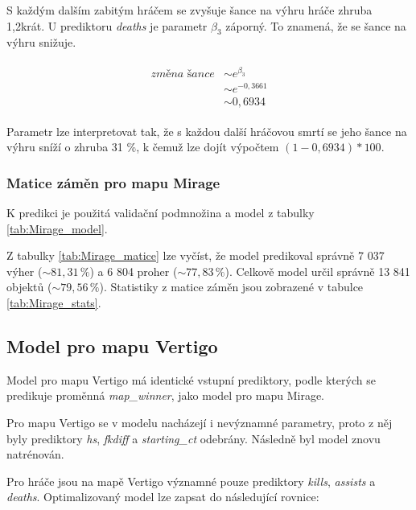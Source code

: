 S každým dalším zabitým hráčem se zvyšuje šance na výhru hráče zhruba 1,2krát. U prediktoru \textit{deaths} je parametr $\beta_3$ záporný. To znamená, že se šance
na výhru snižuje.

\begin{align}
    \begin{split}
        \textit{změna šance} &\sim e^{\beta_3} \\
                             &\sim e^{-0,3661} \\                     
                             &\sim 0,6934
    \end{split}
\end{align}

Parametr lze interpretovat tak, že s každou další hráčovou smrtí se jeho šance na výhru sníží o zhruba 31 \%, k čemuž lze dojít výpočtem $(1 - 0,6934)*100$. 

\subsubsection{Matice záměn pro mapu Mirage}
K predikci je použitá validační podmnožina a model z tabulky \ref{tab:Mirage_model}.





Z tabulky \ref{tab:Mirage_matice} lze vyčíst, že model predikoval správně 7 037 výher ($\sim 81,31 \,\% $) a 6 804 proher ($\sim 77,83 \,\% $).
Celkově model určil správně 13 841 objektů ($\sim 79,56 \,\% $). Statistiky z matice záměn jsou zobrazené v tabulce \ref{tab:Mirage_stats}.

\newpage
\subsection{Model pro mapu Vertigo}
Model pro mapu Vertigo má identické vstupní prediktory, podle kterých se predikuje proměnná \textit{map\_winner}, jako model pro mapu Mirage.



Pro mapu Vertigo se v modelu nacházejí i nevýznamné parametry, proto z něj byly prediktory \textit{hs}, \textit{fkdiff} a \textit{starting\_ct} odebrány.
Následně byl model znovu natrénován.



Pro hráče jsou na mapě Vertigo významné pouze prediktory \textit{kills}, \textit{assists} a \textit{deaths}.
Optimalizovaný model lze zapsat do následující rovnice:

